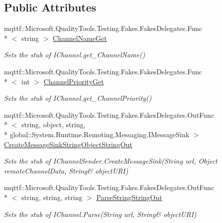 \subsection*{Public Attributes}
\begin{DoxyCompactItemize}
\item 
mqttf\-::\-Microsoft.\-Quality\-Tools.\-Testing.\-Fakes.\-Fakes\-Delegates.\-Func\\*
$<$ string $>$ \hyperlink{class_system_1_1_runtime_1_1_remoting_1_1_channels_1_1_fakes_1_1_stub_i_channel_sender_aa49a417ad379eae9765aa4fc9e3b9b0e}{Channel\-Name\-Get}
\begin{DoxyCompactList}\small\item\em Sets the stub of I\-Channel.\-get\-\_\-\-Channel\-Name()\end{DoxyCompactList}\item 
mqttf\-::\-Microsoft.\-Quality\-Tools.\-Testing.\-Fakes.\-Fakes\-Delegates.\-Func\\*
$<$ int $>$ \hyperlink{class_system_1_1_runtime_1_1_remoting_1_1_channels_1_1_fakes_1_1_stub_i_channel_sender_a2bbbe842dfde1cc11e019ca54cef569d}{Channel\-Priority\-Get}
\begin{DoxyCompactList}\small\item\em Sets the stub of I\-Channel.\-get\-\_\-\-Channel\-Priority()\end{DoxyCompactList}\item 
mqttf\-::\-Microsoft.\-Quality\-Tools.\-Testing.\-Fakes.\-Fakes\-Delegates.\-Out\-Func\\*
$<$ string, object, string, \\*
global\-::\-System.\-Runtime.\-Remoting.\-Messaging.\-I\-Message\-Sink $>$ \hyperlink{class_system_1_1_runtime_1_1_remoting_1_1_channels_1_1_fakes_1_1_stub_i_channel_sender_ab15f1ff0c059e2de555b16b1780e9d27}{Create\-Message\-Sink\-String\-Object\-String\-Out}
\begin{DoxyCompactList}\small\item\em Sets the stub of I\-Channel\-Sender.\-Create\-Message\-Sink(String url, Object remote\-Channel\-Data, String\& object\-U\-R\-I)\end{DoxyCompactList}\item 
mqttf\-::\-Microsoft.\-Quality\-Tools.\-Testing.\-Fakes.\-Fakes\-Delegates.\-Out\-Func\\*
$<$ string, string, string $>$ \hyperlink{class_system_1_1_runtime_1_1_remoting_1_1_channels_1_1_fakes_1_1_stub_i_channel_sender_a788721e116196a276438159a9a7f3d4e}{Parse\-String\-String\-Out}
\begin{DoxyCompactList}\small\item\em Sets the stub of I\-Channel.\-Parse(String url, String\& object\-U\-R\-I)\end{DoxyCompactList}\end{DoxyCompactItemize}


